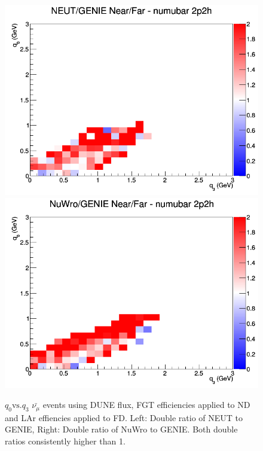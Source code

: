 \documentclass[12pt]{article}
\begin{document}
\begin{figure}[h]
\centering
{}
\includegraphics[width=\linewidth]{eff_q0_q3/FGT/ratios/2p2h_NEUT_GENIE_numubar_NF_q3_q0.png}
\endminipage
{}
\includegraphics[width=\linewidth]{eff_q0_q3/FGT/ratios/2p2h_NuWro_GENIE_numubar_NF_q3_q0.png}
\endminipage
\caption{$q_0 \textrm{vs.} q_3$ $\bar{\nu_{\mu}}$ events using DUNE flux, FGT efficiencies applied to ND and LAr effiencies applied to FD. Left: Double ratio of NEUT to GENIE, Right: Double ratio of NuWro to GENIE. Both double ratios consistently higher than 1.}
\label{fig:q0q3_numubar_2p2h_FGT_eff}
\end{figure}
\FloatBarrier
\end{document}
